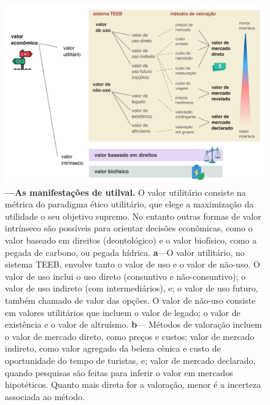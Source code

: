 \documentclass[./main.tex]{subfiles}
\begin{document}
\begin{figure}[t!] 
\centering				
\includegraphics[width=0.98\linewidth]{figs/fig_teeb.jpg}		
\caption[As manifestações de valor utilitário]
{\textbf{---\;As manifestações de \gls{utilval}.}
    O valor utilitário consiste na métrica do paradigma ético utilitário, que elege a maximização da utilidade o seu objetivo supremo. No entanto outras formas de valor intrínseco são possíveis para orientar decisões econômicas, como o valor baseado em direitos (deontológico) e o valor biofísico, como a pegada de carbono, ou pegada hídrica.
    \;\textbf{a}\;---\;O valor utilitário, no sistema TEEB, envolve tanto o valor de uso e o valor de não-uso. O valor de uso inclui o uso direto (consuntivo e não-consuntivo); o valor de uso indireto (com intermediários), e; o valor de uso futuro, também chamado de valor das opções. O valor de não-uso consiste em valores utilitários que incluem o valor de legado; o valor de existência e o valor de altruísmo.
    \;\textbf{b}\;---\; Métodos de valoração incluem o valor de mercado direto, como preços e custos; valor de mercado indireto, como valor agregado da beleza cênica e custo de oportunidade do tempo de turistas, e; valor de mercado declarado, quando pesquisas são feitas para inferir o valor em mercados hipotéticos. Quanto mais direta for a valoração, menor é a incerteza associada ao método.
}
\label{fig:eco:natserv:value} 		
\end{figure}
\end{document}
